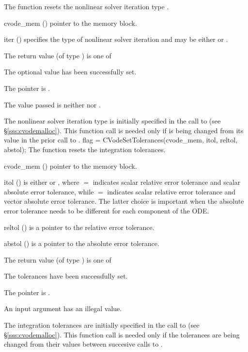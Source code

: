 {
  The function  resets the nonlinear solver
  iteration type .
}
{
  \begin{args}
  \item[cvode\_mem] ()
    pointer to the {\cvode} memory block.
  \item[iter] ()
    specifies the type of nonlinear solver iteration and may be
    either  or . 
  \end{args}
}
{
  The return value  (of type ) is one of
  \begin{args}
  \item[\Id{CV\_SUCCESS}] 
    The optional value has been successfully set.
  \item[\Id{CV\_MEM\_NULL}]
    The  pointer is .
  \item[\Id{CV\_ILL\_INPUT}]
    The  value passed is neither  nor .
  \end{args}
}
{
  The nonlinear solver iteration type is initially specified in the call
  to  (see \S\ref{sss:cvodemalloc}). This function call is
  needed only if  is being changed from its value in the prior call 
  to .
}
{
flag = CVodeSetTolerances(cvode\_mem, itol, reltol, abstol);
}
{
  The function  resets the integration tolerances.
}
{
  \begin{args}
  \item[cvode\_mem] ()
    pointer to the {\cvodes} memory block.
  \item[itol] () 
    is either  or , where $=$ indicates
    scalar relative error tolerance and scalar absolute error tolerance, while
    $=$ indicates scalar relative error tolerance and vector
    absolute error tolerance.  The latter choice is important when the absolute
    error tolerance needs to be different for each component of the ODE. 
  \item[reltol] ()
    is a pointer to the relative error tolerance.
  \item[abstol] ()
    is a pointer to the absolute error tolerance.
  \end{args}
}
{
  The return value  (of type ) is one of
  \begin{args}
  \item[\Id{CV\_SUCCESS}] 
    The tolerances have been successfully set.
  \item[\Id{CV\_MEM\_NULL}]
    The  pointer is .
  \item[\Id{CV\_ILL\_INPUT}]
    An input argument has an illegal value.
  \end{args}
}
{
  The integration tolerances are initially specified in the call
  to  (see \S\ref{sss:cvodemalloc}). This function call is
  needed only if the tolerances are being changed from their values between
  succesive calls to .
}

